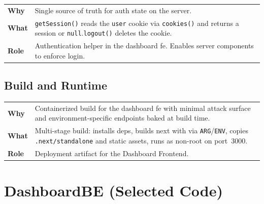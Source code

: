 \documentclass[11pt, a4paper, oneside, listof=totoc]{scrartcl}
\makeatletter
\newcommand{\codesummary}[3]{%
    \vspace{0.4\baselineskip}%
    \noindent\begin{tabularx}{\linewidth}{@{}>{\bfseries}l X@{}}
    Why  & #1\\
    What & #2\\
    Role & #3\\
    \end{tabularx}%
    \vspace{0.2\baselineskip}%
}
\makeatother
\begin{document}
        \clearpage

                \codesummary
                    {Single source of truth for auth state on the server.}
                    {\texttt{getSession()} reads the \texttt{user} cookie via \texttt{cookies()} and returns a session or \texttt{null}.\@\texttt{logout()} deletes the cookie.}%
                    {Authentication helper in the dashboard \gls{fe}. Enables server components to enforce login.}

        \clearpage

            \subsection{Build and Runtime}
                \codesummary
                    {Containerized build for the dashboard \gls{fe} with minimal attack surface and environment-specific endpoints baked at build time.}
                    {Multi-stage build: installs deps, builds \gls{next} with \texttt{\detokenize{CONFIG_ENDPOINT}} via \texttt{ARG}/\texttt{ENV}, copies \texttt{.next/standalone} and static assets, runs as non-root on port~3000.}
                    {Deployment artifact for the Dashboard Frontend.}

        \clearpage

        \section{DashboardBE (Selected Code)}\label{app:dashboardbe}
\end{document}
